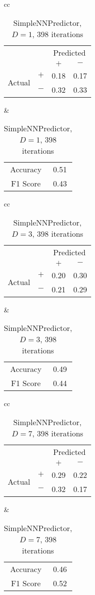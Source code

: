 \documentclass[twocolumn,10pt]{asme2ej}
\begin{document}
\begin{table}
  \begin{tabular}{cc}
    \begin{tabular}{cc|cc}
      & & \multicolumn{2}{c}{Predicted} \\
      & & $+ $ & $-$ \\
      \hline
      \multirow{2}{*}{Actual}
      & $+$ & 0.18 & 0.17 \\
      & $-$ & 0.32 & 0.33 \\
      \hline
    \end{tabular}
    &
    \begin{tabular}{cc}
      Accuracy & 0.51 \\
      F1 Score & 0.43 \\
    \end{tabular}
  \end{tabular}
  \caption{SimpleNNPredictor, $D=1$, 398 iterations}
  \label{pred-perf-SimpleNNPredictor-1-398}
\end{table}


\begin{table}
  \begin{tabular}{cc}
    \begin{tabular}{cc|cc}
      & & \multicolumn{2}{c}{Predicted} \\
      & & $+ $ & $-$ \\
      \hline
      \multirow{2}{*}{Actual}
      & $+$ & 0.20 & 0.30 \\
      & $-$ & 0.21 & 0.29 \\
      \hline
    \end{tabular}
    &
    \begin{tabular}{cc}
      Accuracy & 0.49 \\
      F1 Score & 0.44 \\
    \end{tabular}
  \end{tabular}
  \caption{SimpleNNPredictor, $D=3$, 398 iterations}
  \label{pred-perf-SimpleNNPredictor-3-398}
\end{table}


\begin{table}
  \begin{tabular}{cc}
    \begin{tabular}{cc|cc}
      & & \multicolumn{2}{c}{Predicted} \\
      & & $+ $ & $-$ \\
      \hline
      \multirow{2}{*}{Actual}
      & $+$ & 0.29 & 0.22 \\
      & $-$ & 0.32 & 0.17 \\
      \hline
    \end{tabular}
    &
    \begin{tabular}{cc}
      Accuracy & 0.46 \\
      F1 Score & 0.52 \\
    \end{tabular}
  \end{tabular}
  \caption{SimpleNNPredictor, $D=7$, 398 iterations}
  \label{pred-perf-SimpleNNPredictor-7-398}
\end{table}
\end{document}
